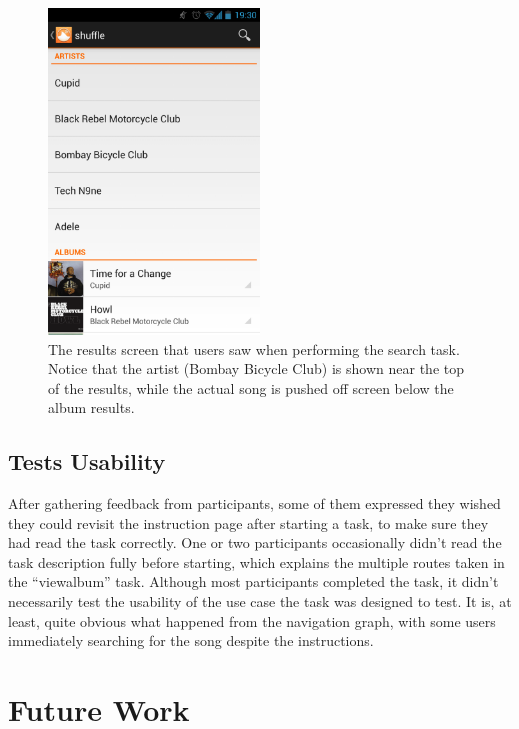 \begin{figure}[h]
  \centering 
  \includegraphics[width=0.5\textwidth]{images/search-results}
  \caption{The results screen that users saw when performing the search task.
           Notice that the artist (Bombay Bicycle Club) is shown near the top of the
           results, while the actual song is pushed off screen below the album
           results.}
  \label{fig:search-results}
\end{figure}

\subsection{Tests Usability}

After gathering feedback from participants, some of them expressed they wished they
could revisit the instruction page after starting a task, to make sure they
had read the task correctly. One or two participants occasionally didn't
read the task description fully before starting, which explains the multiple
routes taken in the ``viewalbum'' task. Although most participants completed the
task, it didn't necessarily test the usability of the use case the task was designed
to test. It is, at least, quite obvious what happened from the navigation graph,
with some users immediately searching for the song despite the instructions.

\section{Future Work}


